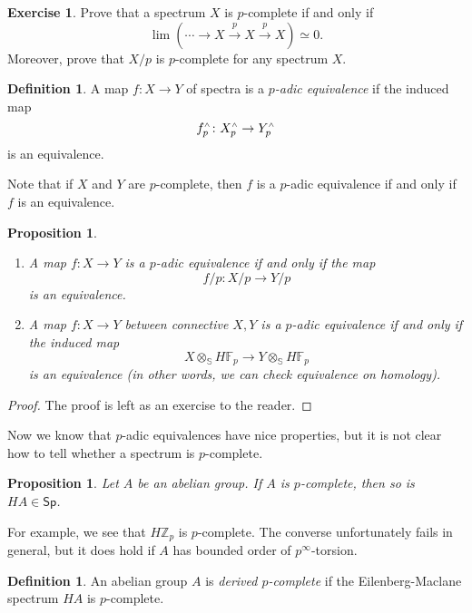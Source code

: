\documentclass[10pt, oneside]{memoir}
\newtheorem{prop}[thm]{Proposition}
\theoremstyle{definition}
\newtheorem{defn}[thm]{Definition}
\newtheorem{exer}[thm]{Exercise}
\theoremstyle{remark}
\theoremstyle{plain}
\theoremstyle{definition}
\theoremstyle{remark}
\newcommand{\Z}{\mathbb{Z}}
\newcommand{\F}{\mathbb{F}}
\newcommand{\bS}{\mathbb{S}}
\newcommand{\ms}[1]{\mathsf{#1}}
\newcommand{\1}{\mathbf{1}}
\newcommand{\2}{\mathbf{2}}
\newcommand{\3}{\mathbf{3}}
\newcommand{\sw}{\mathsmaller{\wedge}}
\begin{document}
\begin{exer}
    Prove that a spectrum $X$ is $p$-complete if and only if
    \[ \lim (\cdots \to X \xrightarrow{p} X \xrightarrow{p} X) \simeq 0. \]
    Moreover, prove that $X/p$ is $p$-complete for any spectrum $X$.
\end{exer}

\begin{defn}
    A map $f \colon X \to Y$ of spectra is a \textit{$p$-adic equivalence} if the induced map
    \[ f_p^{\sw} \colon X_p^{\sw} \to Y_p^{\sw} \]
    is an equivalence.
\end{defn}

Note that if $X$ and $Y$ are $p$-complete, then $f$ is a $p$-adic equivalence if and only if $f$ is an equivalence.

\begin{prop}\leavevmode
    \begin{enumerate}
        \item A map $f \colon X \to Y$ is a $p$-adic equivalence if and only if the map
        \[ f/p \colon X/p \to Y/p \]
        is an equivalence.
        \item A map $f \colon X \to Y$ between connective $X, Y$ is a $p$-adic equivalence if and only if the induced map
        \[ X \otimes_{\bS} H\F_p \to Y \otimes_{\bS} H\F_p \]
        is an equivalence (in other words, we can check equivalence on homology).
    \end{enumerate}
\end{prop}

\begin{proof}
    The proof is left as an exercise to the reader.
\end{proof}

Now we know that $p$-adic equivalences have nice properties, but it is not clear how to tell whether a spectrum is $p$-complete.

\begin{prop}
    Let $A$ be an abelian group. If $A$ is $p$-complete, then so is $HA \in \ms{Sp}$.
\end{prop}

For example, we see that $H \Z_p$ is $p$-complete. The converse unfortunately fails in general, but it does hold if $A$ has bounded order of $p^{\infty}$-torsion.

\begin{defn}
    An abelian group $A$ is \textit{derived $p$-complete} if the Eilenberg-Maclane spectrum $HA$ is $p$-complete.
\end{defn}
\end{document}
